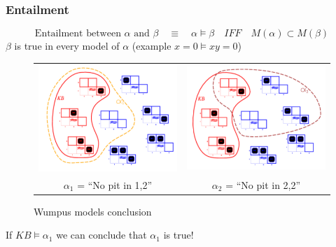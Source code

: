\subsubsection{Entailment} 
$$\textrm{Entailment between } \alpha \textrm{ and } \beta
\quad \equiv \quad \alpha \models \beta  \quad IFF \quad M(\alpha) \subset M(\beta)$$
$\beta$ is true in every model of $\alpha$ (example $x=0 \models xy=0$)

\begin{figure}[h]
    \centering
    \begin{tabular}{cc}
        \includegraphics[width=6cm]{alpha_1.png}
        &
        \includegraphics[width=6cm]{alpha_2.png}
        \\
        $\alpha_1$ = ``No pit in 1,2''
        &
        $\alpha_2$ = ``No pit in 2,2''
        \\
    \end{tabular}
    \caption{Wumpus models conclusion}
\end{figure}

If $KB \models \alpha_1$ we can conclude that $\alpha_1$ is true!


